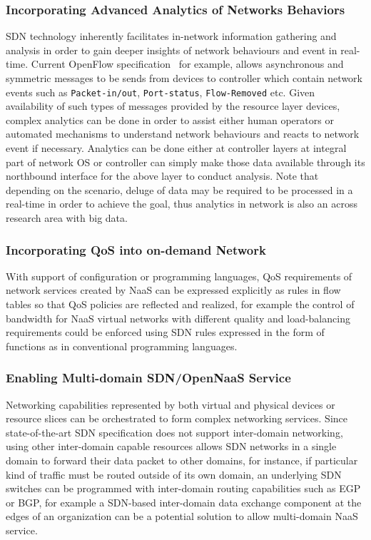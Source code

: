 	\subsubsection{Incorporating Advanced Analytics of Networks Behaviors}

	SDN technology inherently facilitates in-network information gathering and
	analysis in order to gain deeper insights of network behaviours and event
	in real-time. Current OpenFlow specification~\cite{of14} for example,
	allows asynchronous and symmetric messages to be sends from devices to
	controller which contain network events such as \texttt{Packet-in/out},
	\texttt{Port-status}, \texttt{Flow-Removed} etc. Given availability of such
	types of messages provided by the resource layer devices, complex analytics
	can be done in order to assist either human operators or automated
	mechanisms to understand network behaviours and reacts to network event if necessary. 
	Analytics can be done either at controller layers at integral part of network OS 
	or controller can simply make those data available through its northbound interface 
	for the above layer to conduct analysis. Note that depending on the scenario, deluge of 
	data may be required to be processed in a real-time in order to achieve the goal, thus
	analytics in network is also an across research area with big data.

	
	\subsubsection{Incorporating QoS into on-demand Network}

	With support of configuration or programming languages, QoS requirements of
	network services created by NaaS can be expressed explicitly as rules in
	flow tables so that QoS policies are reflected and realized, for example
	the control of bandwidth for NaaS virtual networks with different quality
	and load-balancing requirements could be enforced using SDN rules expressed
	in the form of functions \cite{pyretic} as in conventional programming
	languages. 
	

	\subsubsection{Enabling Multi-domain SDN/OpenNaaS Service}
	
	Networking capabilities represented by both virtual and physical devices or
	resource slices can be orchestrated to form complex networking services.
	Since state-of-the-art SDN specification does not support inter-domain
	networking, using other inter-domain capable resources allows SDN networks
	in a single domain to forward their data packet to other domains, for
	instance, if particular kind of traffic must be routed outside of its own
	domain, an underlying SDN switches can be programmed with inter-domain
	routing capabilities such as EGP or BGP, for example a SDN-based inter-domain
	data exchange component at the edges of an organization can be a potential solution
	to allow multi-domain NaaS service. 
	
